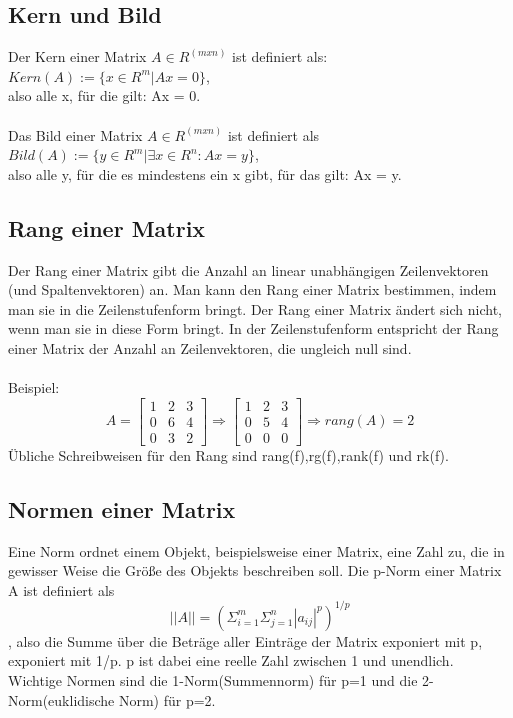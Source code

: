 \documentclass[11pt]{scrreprt}
\begin{document}
\subsection{Kern und Bild}
Der Kern einer Matrix $A \in R^{(mxn)}$ ist definiert als: \\
$Kern(A) := \{x \in R^m|Ax=0\}$,\\ also alle x, für die gilt: Ax = 0.\\
\\
Das Bild einer Matrix $A \in R^{(mxn)}$ ist definiert als \\
$Bild(A) := \{y \in R^m|\exists x \in R^n: Ax=y\}$,\\ also alle y, für die es mindestens ein x gibt, für das gilt: Ax = y.

\subsection{Rang einer Matrix}
Der Rang einer Matrix gibt die Anzahl an linear unabhängigen Zeilenvektoren (und Spaltenvektoren) an. Man kann den Rang einer Matrix bestimmen, indem man sie in die Zeilenstufenform bringt. Der Rang einer Matrix ändert sich nicht, wenn man sie in diese Form bringt. In der Zeilenstufenform entspricht der Rang einer Matrix der Anzahl an Zeilenvektoren, die ungleich null sind.\\
\\
Beispiel:
\begin{equation}
A = \begin{bmatrix}
1 & 2 & 3\\
0 & 6 & 4\\
0 & 3 & 2
\end{bmatrix}
\Rightarrow
\begin{bmatrix}
1 & 2 & 3\\
0 & 5 & 4\\
0 & 0 & 0
\end{bmatrix}
\Rightarrow rang(A) = 2
\end{equation}
Übliche Schreibweisen für den Rang sind rang(f),rg(f),rank(f) und rk(f).
\subsection{Normen einer Matrix}
Eine Norm ordnet einem Objekt, beispielsweise einer Matrix, eine Zahl zu, die in gewisser Weise die Größe des Objekts beschreiben soll.
Die p-Norm einer Matrix A ist definiert als
\begin{equation}
||A|| = (\Sigma_{i=1}^m \Sigma_{j=1}^n |a_{ij}|^p)^{1/p}
\end{equation}
, also die Summe über die Beträge aller Einträge der Matrix exponiert mit p,  exponiert mit 1/p. p ist dabei eine reelle Zahl zwischen 1 und unendlich. Wichtige Normen sind die 1-Norm(Summennorm) für p=1 und die 2-Norm(euklidische Norm) für p=2.
\end{document}
